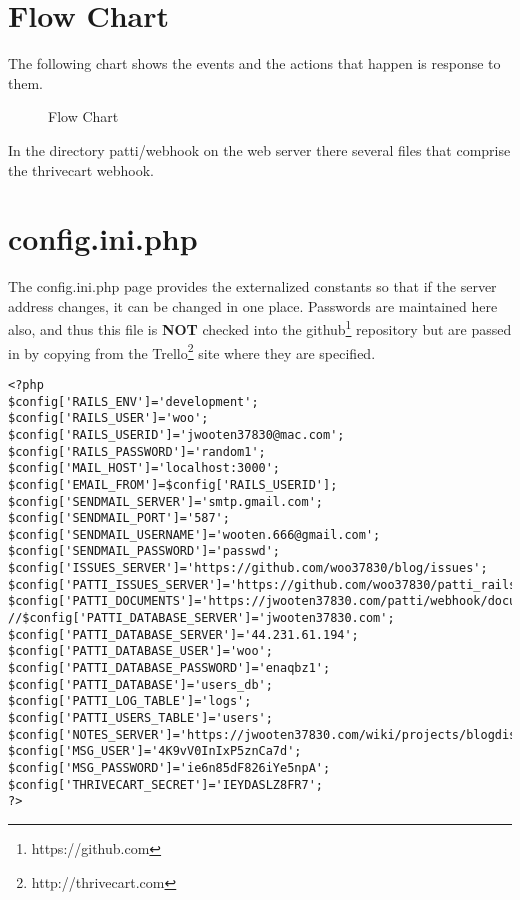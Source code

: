 \documentclass[final,letterpaper,12pt]{article}
\begin{document}
\section{Flow Chart}
\noindent The following chart shows the events and the actions that happen is response to them.
\smallskip
\begin{figure}[ht]
\begin{center}
\caption{\label{fig:flowchart}Flow Chart}
\end{center}
\end{figure}
\newpage
\begin{appendices}
\noindent In the directory patti/webhook on the web server there several files that comprise the thrivecart webhook.
\section{config.ini.php}
\noindent The config.ini.php page provides the externalized constants so that if the server address changes, it can be changed in one place.  Passwords are maintained here also, and thus this file is {\bf NOT} checked into the github\footnote{https://github.com} repository but are passed in by copying from the Trello\footnote{http://thrivecart.com} site where they are specified.
\begin{verbatim}
<?php
$config['RAILS_ENV']='development';
$config['RAILS_USER']='woo';
$config['RAILS_USERID']='jwooten37830@mac.com';
$config['RAILS_PASSWORD']='random1';
$config['MAIL_HOST']='localhost:3000';
$config['EMAIL_FROM']=$config['RAILS_USERID'];
$config['SENDMAIL_SERVER']='smtp.gmail.com';
$config['SENDMAIL_PORT']='587';
$config['SENDMAIL_USERNAME']='wooten.666@gmail.com';
$config['SENDMAIL_PASSWORD']='passwd';
$config['ISSUES_SERVER']='https://github.com/woo37830/blog/issues';
$config['PATTI_ISSUES_SERVER']='https://github.com/woo37830/patti_rails/issues';
$config['PATTI_DOCUMENTS']='https://jwooten37830.com/patti/webhook/documentation/Documentation.html';
//$config['PATTI_DATABASE_SERVER']='jwooten37830.com';
$config['PATTI_DATABASE_SERVER']='44.231.61.194';
$config['PATTI_DATABASE_USER']='woo';
$config['PATTI_DATABASE_PASSWORD']='enaqbz1';
$config['PATTI_DATABASE']='users_db';
$config['PATTI_LOG_TABLE']='logs';
$config['PATTI_USERS_TABLE']='users';
$config['NOTES_SERVER']='https://jwooten37830.com/wiki/projects/blogdiscussions/Blog_Discussions.html';
$config['MSG_USER']='4K9vV0InIxP5znCa7d';
$config['MSG_PASSWORD']='ie6n85dF826iYe5npA';
$config['THRIVECART_SECRET']='IEYDASLZ8FR7';
?>
\end{verbatim}

\end{appendices}
\end{document}
